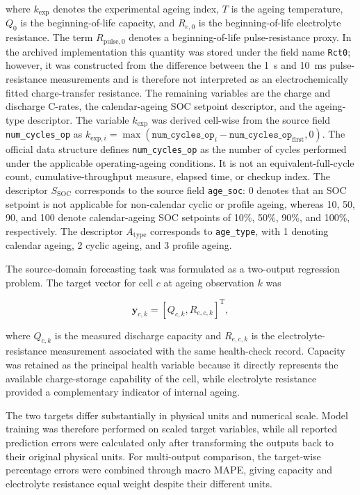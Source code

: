 \documentclass[a4paper,fleqn]{cas-sc}
\begin{document}
where $k_{\mathrm{exp}}$ denotes the experimental ageing index, $T$ is the ageing temperature, $Q_{0}$ is the beginning-of-life capacity, and $R_{e,0}$ is the beginning-of-life electrolyte resistance. The term $R_{\mathrm{pulse},0}$ denotes a beginning-of-life pulse-resistance proxy. In the archived implementation this quantity was stored under the field name \texttt{Rct0}; however, it was constructed from the difference between the 1~s and 10~ms pulse-resistance measurements and is therefore not interpreted as an electrochemically fitted charge-transfer resistance. The remaining variables are the charge and discharge C-rates, the calendar-ageing SOC setpoint descriptor, and the ageing-type descriptor. The variable $k_{\mathrm{exp}}$ was derived cell-wise from the source field \texttt{num\_cycles\_op} as $k_{\mathrm{exp},i}= \max(\texttt{num\_cycles\_op}_{i}- \texttt{num\_cycles\_op}_{\mathrm{first}},0)$. The official data structure defines \texttt{num\_cycles\_op} as the number of cycles performed under the applicable operating-ageing conditions. It is not an equivalent-full-cycle count, cumulative-throughput measure, elapsed time, or checkup index. The descriptor $S_{\mathrm{SOC}}$ corresponds to the source field \texttt{age\_soc}: 0 denotes that an SOC setpoint is not applicable for non-calendar cyclic or profile ageing, whereas 10, 50, 90, and 100 denote calendar-ageing SOC setpoints of 10\%, 50\%, 90\%, and 100\%, respectively. The descriptor $A_{\mathrm{type}}$ corresponds to \texttt{age\_type}, with 1 denoting calendar ageing, 2 cyclic ageing, and 3 profile ageing.


The source-domain forecasting task was formulated as a two-output regression problem. The target vector for cell $c$ at ageing observation $k$ was

\begin{equation}
\mathbf{y}_{c,k}
=
\left[
Q_{c,k},
R_{e,c,k}
\right]^{\mathrm{T}},
\label{eq:target_vector}
\end{equation}

where $Q_{c,k}$ is the measured discharge capacity and $R_{e,c,k}$ is the electrolyte-resistance measurement associated with the same health-check record. Capacity was retained as the principal health variable because it directly represents the available charge-storage capability of the cell, while electrolyte resistance provided a complementary indicator of internal ageing.

The two targets differ substantially in physical units and numerical scale. Model training was therefore performed on scaled target variables, while all reported prediction errors were calculated only after transforming the outputs back to their original physical units. For multi-output comparison, the target-wise percentage errors were combined through macro MAPE, giving capacity and electrolyte resistance equal weight despite their different units.
\end{document}
